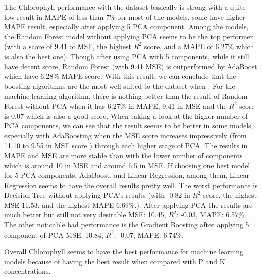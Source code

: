 The Chlorophyll performance with the dataset basically is strong with a quite low result in MAPE of less than 7\% for most of the models, some have higher MAPE result, especially after applying 5 PCA component. Among the models, the Random Forest model without applying PCA seems to be the top performer (with a score of 9.41 of MSE, the highest \(R^2\)  score, and a MAPE of 6.27\% which is also the best one). Though after using PCA with 5 components, while it still have decent score, Random Forest (with 9.41 MSE) is outperformed by AdaBoost which have 6.28\% MAPE score. With this result, we can conclude that the boosting algorithms are the most well-suited to the dataset when . For the machine learning algorithm, there is nothing better than the result of Random Forest without PCA when it has 6.27\% in MAPE, 9.41 in MSE and the \(R^2\) score is 0.07 which is also a good score. When taking a look at the higher number of PCA components, we can see that the result seems to be better in some models, especially with AdaBoosting when the MSE score increases impressively (from 11.10 to 9.55 in MSE score ) through each higher stage of PCA. The results in MAPE and MSE are more stable than with the lower number of components which is around 10 in MSE and around 6.5 in MSE. If choosing one best model for 5 PCA components, AdaBoost, and Linear Regression, among them, Linear Regression seems to have the overall results pretty well. The worst performance is Decision Tree without applying PCA's results (with -0.82 in  \(R^2\) score, the highest MSE 11.53, and the highest MAPE 6.69\%.). After applying PCA the results are much better but still not very desirable MSE: 10.45, \(R^2\): -0.03, MAPE: 6.57\%. The other noticable bad performance is the Gradient Boosting after applying 5 component of PCA MSE: 10.84, \(R^2\): -0.07, MAPE: 6.74\%.

Overall Chlorophyll seems to have the best performance for machine learning models because of having the best result when compared with P and K concentrations.

